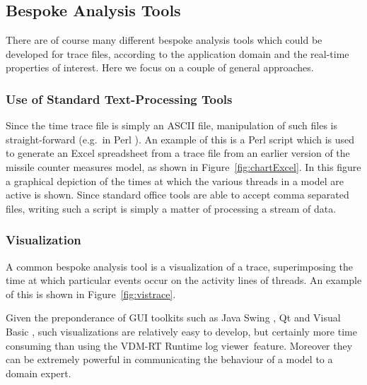 \documentclass{overturerepchap}
\newcommand{\showtrace}{VDM-RT Runtime log viewer}
\begin{document}
\subsection{Bespoke Analysis Tools}

There are of course many different bespoke analysis tools which could
be developed for trace files, according to the application domain and
the real-time properties of interest.  Here we focus on a couple of
general approaches.

\subsubsection{Use of Standard Text-Processing Tools}

Since the time trace file is simply an ASCII file, manipulation of
such files is straight-forward (e.g.\ in Perl \cite{Wall&92}). An
example of this is a Perl script which is used to generate an Excel
spreadsheet from a trace file from an earlier version of the
missile counter measures model, as shown in
Figure~\ref{fig:chartExcel}. In this figure a graphical depiction of
the times at which the various threads in a model are active is
shown. Since standard office tools are able to accept comma separated
files, writing such a script is simply a matter of processing a stream
of data.

\subsubsection{Visualization}

A common bespoke analysis tool is a visualization of a trace,
superimposing the time at which particular events occur on the
activity lines of threads. An example of this is shown in
Figure~\ref{fig:vistrace}.

Given the preponderance of GUI toolkits such as Java Swing
\cite{JavaSwing}, Qt \cite{Qt} and Visual Basic \cite{VisualBasic},
such visualizations are relatively easy to develop, but certainly more
time consuming than using the \showtrace\ feature. Moreover they
can be extremely powerful in communicating the behaviour of a model to
a domain expert.
\end{document}
